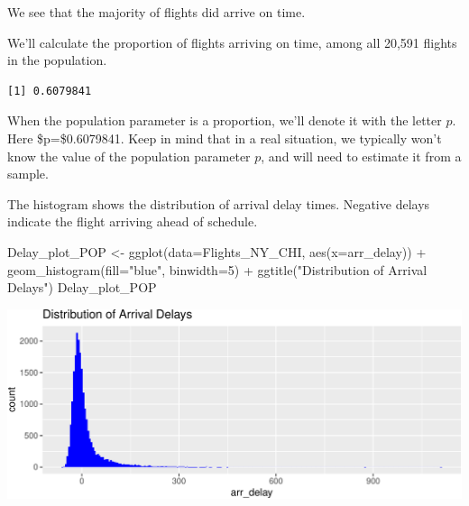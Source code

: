 \documentclass[
  letterpaper,
  DIV=11,
  numbers=noendperiod]{scrreprt}
\newenvironment{Shaded}{\begin{snugshade}}{\end{snugshade}}
\newcommand{\AttributeTok}[1]{\textcolor[rgb]{0.40,0.45,0.13}{#1}}
\newcommand{\CommentTok}[1]{\textcolor[rgb]{0.37,0.37,0.37}{#1}}
\newcommand{\DecValTok}[1]{\textcolor[rgb]{0.68,0.00,0.00}{#1}}
\newcommand{\FunctionTok}[1]{\textcolor[rgb]{0.28,0.35,0.67}{#1}}
\newcommand{\NormalTok}[1]{\textcolor[rgb]{0.00,0.23,0.31}{#1}}
\newcommand{\OtherTok}[1]{\textcolor[rgb]{0.00,0.23,0.31}{#1}}
\newcommand{\SpecialCharTok}[1]{\textcolor[rgb]{0.37,0.37,0.37}{#1}}
\newcommand{\StringTok}[1]{\textcolor[rgb]{0.13,0.47,0.30}{#1}}
\begin{document}
We see that the majority of flights did arrive on time.

We'll calculate the proportion of flights arriving on time, among all
20,591 flights in the population.

\begin{Shaded}
\end{Shaded}

\begin{verbatim}
[1] 0.6079841
\end{verbatim}

When the population parameter is a proportion, we'll denote it with the
letter \(p\). Here \$p=\$0.6079841. Keep in mind that in a real
situation, we typically won't know the value of the population parameter
\(p\), and will need to estimate it from a sample.

The histogram shows the distribution of arrival delay times. Negative
delays indicate the flight arriving ahead of schedule.

\begin{Shaded}
\begin{Highlighting}[]
\NormalTok{Delay\_plot\_POP }\OtherTok{\textless{}{-}} \FunctionTok{ggplot}\NormalTok{(}\AttributeTok{data=}\NormalTok{Flights\_NY\_CHI, }\FunctionTok{aes}\NormalTok{(}\AttributeTok{x=}\NormalTok{arr\_delay)) }\SpecialCharTok{+} 
  \FunctionTok{geom\_histogram}\NormalTok{(}\AttributeTok{fill=}\StringTok{"blue"}\NormalTok{, }\AttributeTok{binwidth=}\DecValTok{5}\NormalTok{) }\SpecialCharTok{+} 
  \FunctionTok{ggtitle}\NormalTok{(}\StringTok{"Distribution of Arrival Delays"}\NormalTok{)}
\NormalTok{Delay\_plot\_POP}
\end{Highlighting}
\end{Shaded}

\includegraphics{Ch3_files/figure-pdf/unnamed-chunk-7-1.pdf}
\end{document}
